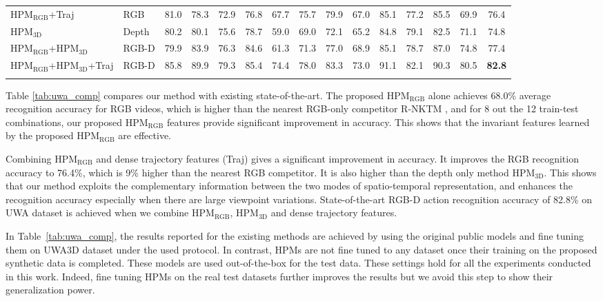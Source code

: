 \documentclass[twocolumn]{svjour3}          \smartqed  \usepackage{graphicx}
\begin{document}
\begin{table*}[t]
\begin{tabular}{llccccccccccccc}
HPM$_{\mathrm{RGB}}$+Traj & RGB & 81.0 & 78.3 & 72.9 & 76.8 & 67.7 & 75.7 & 79.9 & 67.0 & 85.1 & 77.2 & 85.5 & 69.9 & 76.4 \\ 

HPM$_{\mathrm{3D}}$ & Depth & 80.2 & 80.1 & 75.6 & 78.7 & 59.0 & 69.0 & 72.1 & 65.2 & 84.8 & 79.1 & 82.5 & 71.1 & 74.8 \\ 

HPM$_{\mathrm{RGB}}$+HPM$_{\mathrm{3D}}$ & RGB-D & 79.9 & 83.9 & 76.3 & 84.6 & 61.3 & 71.3 & 77.0 & 68.9 & 85.1 & 78.7 & 87.0 & 74.8 & 77.4 \\

HPM$_{\mathrm{RGB}}$+HPM$_{\mathrm{3D}}$+Traj & RGB-D & 85.8 & 89.9 & 79.3 & 85.4 & 74.4 & 78.0 & 83.3 & 73.0 & 91.1 & 82.1 & 90.3 & 80.5 & \textbf{82.8}\\

\hline\noalign{\smallskip}
\end{tabular}
\label{tab:uwa_comp}
\end{table*}


Table \ref{tab:uwa_comp} compares our method with existing state-of-the-art. The proposed HPM$_{\mathrm{RGB}}$ alone achieves 68.0\% average recognition accuracy for RGB videos, which is higher than the nearest RGB-only competitor R-NKTM \citep{rahmani2017learning}, and for 8 out the 12 train-test combinations, our proposed HPM$_{\mathrm{RGB}}$ features provide significant improvement in accuracy. This shows that the invariant features learned by the proposed HPM$_{\mathrm{RGB}}$ are effective.

Combining HPM$_{\mathrm{RGB}}$ and dense trajectory features (Traj) gives a significant improvement in accuracy. It improves the RGB recognition accuracy to 76.4\%, which is 9\% higher than the nearest RGB competitor. It is also higher than the depth only method HPM$_{\mathrm{3D}}$. This shows that our method exploits the complementary information between the two modes of spatio-temporal representation, and enhances the recognition accuracy especially when there are large viewpoint variations. State-of-the-art RGB-D action recognition accuracy of 82.8\% on UWA dataset is achieved when we combine HPM$_{\mathrm{RGB}}$, HPM$_{\mathrm{3D}}$ and dense trajectory features.


In Table~\ref{tab:uwa_comp},  the results reported for the existing methods are achieved by using the original public models  and fine tuning them on UWA3D dataset under the used protocol. In contrast,  HPMs are not fine tuned to any dataset once  their training on the proposed synthetic data is completed. These  models are used out-of-the-box for the test data. These settings hold for all the experiments conducted in this work.  Indeed, fine tuning HPMs  on the real test datasets further improves the results but we avoid this step to show their generalization power.
\end{document}

